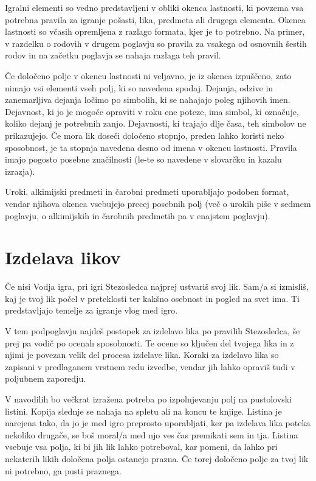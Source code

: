 Igralni elementi so vedno predstavljeni v obliki okenca lastnosti, ki povzema vsa potrebna pravila za igranje pošasti, lika, predmeta ali drugega elementa. Okenca lastnosti so včasih opremljena z razlago formata, kjer je to potrebno. Na primer, v razdelku o rodovih v drugem poglavju so pravila za vsakega od osnovnih šestih rodov in na začetku poglavja se nahaja razlaga teh pravil.

Če določeno polje v okencu lastnosti ni veljavno, je iz okenca izpuščeno, zato nimajo vsi elementi vseh polj, ki so navedena spodaj. Dejanja, odzive in zanemarljiva dejanja ločimo po simbolih, ki se nahajajo poleg njihovih imen. Dejavnost, ki jo je mogoče opraviti v roku ene poteze, ima simbol, ki označuje, koliko dejanj je potrebnih zanjo. Dejavnosti, ki trajajo dlje časa, teh simbolov ne prikazujejo. Če mora lik doseči določeno stopnjo, preden lahko koristi neko sposobnost, je ta stopnja navedena desno od imena v okencu lastnosti. Pravila imajo pogosto posebne značilnosti (le-te so navedene v slovarčku in kazalu izrazja).

Uroki, alkimijski predmeti in čarobni predmeti uporabljajo podoben format, vendar njihova okenca vsebujejo precej posebnih polj (več o urokih piše v sedmem poglavju, o alkimijskih in čarobnih predmetih pa v enajstem poglavju).

\section{Izdelava likov}
Če nisi Vodja igra, pri igri Stezosledca najprej ustvariš svoj lik. Sam/a si izmisliš, kaj je tvoj lik počel v preteklosti ter kakšno osebnost in pogled na svet ima. Ti predstavljajo temelje za igranje vlog med igro.

V tem podpoglavju najdeš postopek za izdelavo lika po pravilih Stezosledca, še prej pa vodič po ocenah sposobnosti. Te ocene so ključen del tvojega lika in z njimi je povezan velik del procesa izdelave lika. Koraki za izdelavo lika so zapisani v predlaganem vrstnem redu izvedbe, vendar jih lahko opraviš tudi v poljubnem zaporedju.

V navodilih bo večkrat izražena potreba po izpolnjevanju polj na pustolovski listini. Kopija slednje se nahaja na spletu ali na koncu te knjige. Listina je narejena tako, da jo je med igro preprosto uporabljati, ker pa izdelava lika poteka nekoliko drugače, se boš moral/a med njo ves čas premikati sem in tja. Listina vsebuje vsa polja, ki bi jih lik lahko potreboval, kar pomeni, da lahko pri nekaterih likih določena polja ostanejo prazna. Če torej določeno polje za tvoj lik ni potrebno, ga pusti praznega.

